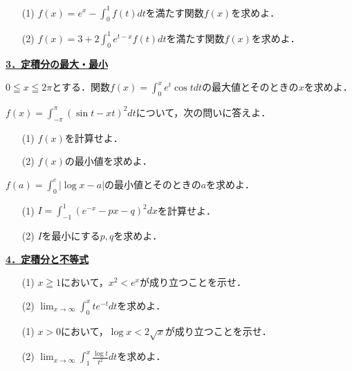 \documentclass[a4paper,11pt]{ltjsarticle}
\begin{document}
\begin{toi}
    \begin{itemize}
        \item [(1)]$\displaystyle{f(x)=e^x-\int_0^1 f(t)dt}$を満たす関数$f(x)$を求めよ．
        \item [(2)]$\displaystyle{f(x)=3+2\int_0^1e^{t-x}f(t)dt}$を満たす関数$f(x)$を求めよ．
    \end{itemize}
\end{toi}
\noindent \underline{{\large{\textbf{3．定積分の最大・最小}}}}
\begin{toi}
$0\leqq x\leqq2\pi$とする．関数$f(x)=\displaystyle{\int_0^x e^t\cos tdt}$の最大値とそのときの$x$を求めよ．
\end{toi}
\begin{toi}
$f(x)= \displaystyle{\int_{-\pi}^\pi (\sin t-xt)^2dt}$について，次の問いに答えよ．
\begin{itemize}
    \item [(1)]$f(x)$を計算せよ．
    \item [(2)]$f(x)$の最小値を求めよ．
\end{itemize}
\end{toi}
\begin{toi}
$f(a)=\displaystyle{\int_0^e| \log x-a|}$の最小値とそのときの$a$を求めよ．
\end{toi}
\begin{toi}
\begin{itemize}
\item[(1)]$\displaystyle{I=\int_{-1}^1(e^{-x}-px-q)^2dx}$を計算せよ．
\item [(2)]$I$を最小にする$p,q$を求めよ．
\end{itemize}
\end{toi}
\noindent \underline{{\large{\textbf{4．定積分と不等式}}}}
\begin{toi}
\begin{itemize}
    \item [(1)]$x\geqq 1$において，$x^2<e^x$が成り立つことを示せ．
    \item [(2)]$\displaystyle{\lim_{x\to\infty }\int_0^x te^{-t}dt}$を求めよ．
\end{itemize}
\end{toi}
\begin{toi}
\begin{itemize}
    \item [(1)]$x>0$において，$\log x<2\sqrt x$が成り立つことを示せ．
    \item [(2)]$\displaystyle{\lim_{x\to\infty }\int_1^x\frac{\log t}{t^2}dt}$を求めよ．
\end{itemize}
\end{toi}
\end{document}
